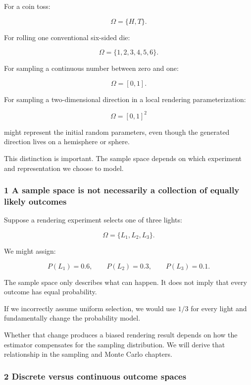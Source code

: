 For a coin toss:

\[
 \Omega=\{H,T\}.
\]

For rolling one conventional six-sided die:

\[
 \Omega=\{1,2,3,4,5,6\}.
\]

For sampling a continuous number between zero and one:

\[
 \Omega=[0,1].
\]

For sampling a two-dimensional direction in a local rendering parameterization:

\[
 \Omega=[0,1]^2
\]

might represent the initial random parameters, even though the generated direction lives on a hemisphere or sphere.

This distinction is important. The sample space depends on which experiment and representation we choose to model.

\subsubsection{1 A sample space is not necessarily a collection of equally likely outcomes}\label{02-foundations-ii-ch023-a-sample-space-is-not-necessarily-a-collection-of-equally-likely-outcomes}

\hypertarget{02-foundations-ii-ch023-a-sample-space-is-not-necessarily-a-collection-of-equally-likely-outcomes}{}

Suppose a rendering experiment selects one of three lights:

\[
 \Omega=\{L_1,L_2,L_3\}.
\]

We might assign:

\[
 P(L_1)=0.6,\qquad P(L_2)=0.3,\qquad P(L_3)=0.1.
\]

The sample space only describes what can happen. It does not imply that every outcome has equal probability.

If we incorrectly assume uniform selection, we would use \(1/3\) for every light and fundamentally change the probability model.

Whether that change produces a biased rendering result depends on how the estimator compensates for the sampling distribution. We will derive that relationship in the sampling and Monte Carlo chapters.

\subsubsection{2 Discrete versus continuous outcome spaces}\label{02-foundations-ii-ch023-discrete-versus-continuous-outcome-spaces}

